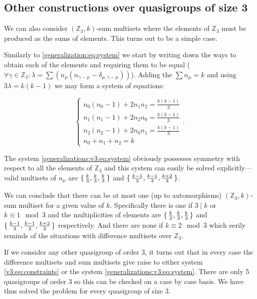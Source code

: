 \subsection{Other constructions over quasigroups of size 3}
    \label{sec:v3}
    We can also consider $(\mathbb Z_3,k)$-sum multisets where the elements of $\mathbb Z_3$ must be produced as the sums of elements. This turns out to be a simple case.

    Similarly to \eqref{generalization:eq:system} we start by writing down the ways to obtain each of the elements and requiring them to be equal ($\forall \gamma \in \mathbb Z_3 \colon  \lambda = \sum (n_\mu (n_{\gamma-\mu}-\delta_{\mu,\gamma-\mu}))$). Adding the $\sum n_\mu = k$ and using $3\lambda = k(k-1)$ we may form a system of equations:
    
    \begin{equation}
        \label{generalizations:v3:eq:system}
        \begin{cases}
            n_0 (n_0-1) + 2 n_1 n_2 = \frac{k(k-1)}{3} \\
            n_1 (n_1-1) + 2 n_2 n_0 = \frac{k(k-1)}{3} \\
            n_2 (n_2-1) + 2 n_0 n_1 = \frac{k(k-1)}{3} \\
            n_0 + n_1 + n_2 = k
        \end{cases}.
    \end{equation}

    The system \eqref{generalizations:v3:eq:system} obviously possesses symmetry with respect to all the elements of $\mathbb Z_3$ and this system can easily be solved explicitly---valid multisets of $n_\mu$ are $\set{\frac k 3, \frac k 3, \frac k 3}$ and $\set{\frac{k-1}{3}, \frac{k-1}{3}, \frac{k+2}{3}}$.
    
    We can conclude that there can be at most one (up to automorphisms) $(\mathbb Z_3, k)$-sum multiset for a given value of $k$. Specifically there is one if $3 \mid k$ or $k \equiv 1 \mod 3$ and the multiplicities of elements are $\set{\frac k 3, \frac k 3, \frac k 3}$ and $\set{\frac{k-1}{3}, \frac{k-1}{3}, \frac{k+2}{3}}$ respectively. And there are none if $k \equiv 2 \mod 3$ which eerily reminds of the situations with difference multisets over $\mathbb Z_3$.
    
    If we consider any other quasigroup of order 3, it turns out that in every case the difference multisets and sum multisets give raise to either system \eqref{v3:eq:constraints} or the system \eqref{generalizations:v3:eq:system}. There are only 5 quasigroups of order 3 so this can be checked on a case by case basis. We have thus solved the problem for every quasigroup of size 3.
    
